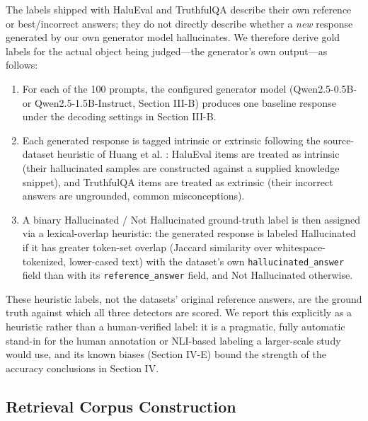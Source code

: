 \documentclass[conference]{IEEEtran}
\begin{document}
The labels shipped with HaluEval and TruthfulQA describe their own reference or best/incorrect answers; they do not directly describe whether a \emph{new} response generated by our own generator model hallucinates. We therefore derive gold labels for the actual object being judged---the generator's own output---as follows:

\begin{enumerate}
    \item For each of the 100 prompts, the configured generator model (Qwen2.5-0.5B- or Qwen2.5-1.5B-Instruct, Section III-B) produces one baseline response under the decoding settings in Section III-B.
    \item Each generated response is tagged intrinsic or extrinsic following the source-dataset heuristic of Huang et al. \cite{huang2023survey}: HaluEval items are treated as intrinsic (their hallucinated samples are constructed against a supplied knowledge snippet), and TruthfulQA items are treated as extrinsic (their incorrect answers are ungrounded, common misconceptions).
    \item A binary Hallucinated / Not Hallucinated ground-truth label is then assigned via a lexical-overlap heuristic: the generated response is labeled Hallucinated if it has greater token-set overlap (Jaccard similarity over whitespace-tokenized, lower-cased text) with the dataset's own \texttt{hallucinated\_answer} field than with its \texttt{reference\_answer} field, and Not Hallucinated otherwise.
\end{enumerate}

These heuristic labels, not the datasets' original reference answers, are the ground truth against which all three detectors are scored. We report this explicitly as a heuristic rather than a human-verified label: it is a pragmatic, fully automatic stand-in for the human annotation or NLI-based labeling a larger-scale study would use, and its known biases (Section IV-E) bound the strength of the accuracy conclusions in Section IV.

\subsection{Retrieval Corpus Construction}
\end{document}
